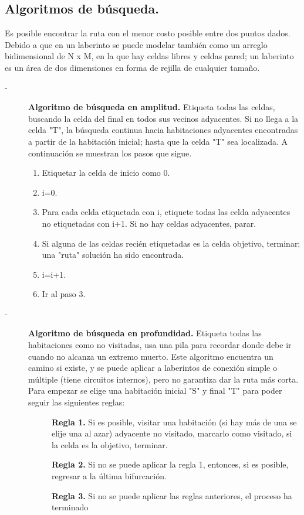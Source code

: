 \subsection*{Algoritmos de búsqueda.}
\noindent Es posible encontrar la ruta con el menor costo posible entre dos puntos dados. Debido a que en un laberinto se puede modelar también como un arreglo bidimensional de N x M, en la que hay celdas libres y celdas pared; un laberinto es un área de dos dimensiones en forma de rejilla de cualquier tamaño.
\begin{description}
    \item[-]\textbf{Algoritmo de búsqueda en amplitud.} Etiqueta todas las celdas, buscando la celda del final en todos sus vecinos adyacentes. Si no llega a la celda "T", la búsqueda continua hacia habitaciones adyacentes encontradas a partir de la habitación inicial; hasta que la celda "T" sea localizada. A continuación se muestran los pasos que sigue.
    \begin{enumerate}
        \item Etiquetar la celda de inicio como 0.
        \item i=0.
        \item Para cada celda etiquetada con i, etiquete todas las celda adyacentes no etiquetadas con i+1. Si no hay celdas adyacentes, parar.
        \item Si alguna de las celdas recién etiquetadas es la celda objetivo, terminar; una "ruta" solución ha sido encontrada.
        \item i=i+1.
        \item Ir al paso 3.
    \end{enumerate}
    
    \item[-]\textbf{Algoritmo de búsqueda en profundidad.} Etiqueta todas las habitaciones como no visitadas, usa una pila para recordar donde debe ir cuando no alcanza un extremo muerto. Este algoritmo encuentra un camino si existe, y se puede aplicar a laberintos de conexión simple o múltiple (tiene circuitos internos), pero no garantiza dar la ruta más corta. Para empezar se elige una habitación inicial "S" y final "T" para poder seguir las siguientes reglas:
    \begin{description}
        \item[ ]\textbf{Regla 1.} Si es posible, visitar una habitación (si hay más de una se elije una al azar) adyacente no visitado, marcarlo como visitado, si la celda es la objetivo, terminar.
        \item[ ]\textbf{Regla 2.} Si no se puede aplicar la regla 1, entonces, si es posible, regresar a la última bifurcación.
        \item[ ]\textbf{Regla 3.} Si no se puede aplicar las reglas anteriores, el proceso ha terminado
    \end{description}


\end{description}
